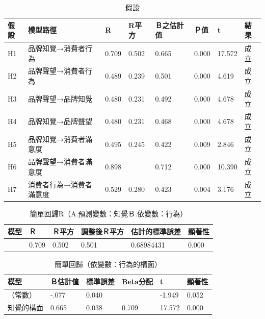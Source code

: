 \begin{table}[htb]
\caption{假設}
\label{tab:p7}
\renewcommand{\arraystretch}{1.2} %
\arrayrulewidth=1pt               %
\tabcolsep=10pt                   %
\begin{tabular}[t]{llllllll}  %
\hline
 假設&模型路徑&R&R平方&Ｂ之估計值& Ｐ值& t& 結果 \\
\hline
H1&品牌知覺→消費者行為&0.709&0.502&0.665&0.000&17.572&成立\\
H2&品牌聲望→消費者行為&0.489&0.239&0.501&0.000&4.619&成立\\
H3&品牌聲望→品牌知覺&0.480&0.231&0.492&0.000&4.678&成立\\
H4&品牌知覺→品牌聲望&0.480&0.231&0.468&0.000&4.678&成立\\
H5&品牌知覺→消費者滿意度&0.495&0.245&0.422&0.009&2.846&成立\\
H6&品牌聲望→消費者滿意度&0.898&&0.712&0.000&10.390&成立\\
H7&消費者行為→消費者滿意度&0.529&0.280&0.423&0.004&3.176&成立\\
\hline
\end{tabular}
\end{table}

\begin{table}[htb]
\caption{簡單回歸R（A.預測變數：知覺Ｂ.依變數：行為）}
\label{tab:R3}
\renewcommand{\arraystretch}{1.2} %
\arrayrulewidth=1pt               %
\tabcolsep=10pt                   %
\begin{tabular}[t]{llllll}  %
\hline
 模型&Ｒ&Ｒ平方&調整後Ｒ平方&估計的標準誤差&顯著性\\
\hline
&0.709&0.502&0.501&0.68984431&0.000\\
\hline
\end{tabular}
\end{table}


\begin{table}[htb]
\caption{簡單回歸（依變數：行為的構面）}
\label{tab:H1}
\renewcommand{\arraystretch}{1.2} %
\arrayrulewidth=1pt               %
\tabcolsep=10pt                   %
\begin{tabular}[t]{llllll}  %
\hline
 模型&Ｂ估計值&標準誤差&Beta分配&t&顯著性\\
\hline
（常數）&-.077&0.040& &-1.949&0.052\\
知覺的構面&0.665&0.038&0.709&17.572&0.000\\
\hline
\end{tabular}
\end{table}

